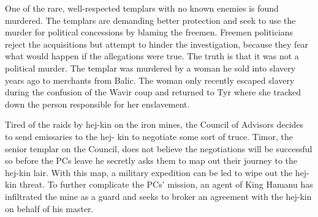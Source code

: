 {	\item One of the rare, well-respected templars with no known enemies is found murdered. The templars are demanding better protection and seek to use the murder for political concessions by blaming the freemen. Freemen politicians reject the acquisitions but attempt to hinder the investigation, because they fear what would happen if the allegations were true. The truth is that it was not a political murder. The templar was murdered by a woman he sold into slavery years ago to merchants from Balic. The woman only recently escaped slavery during the confusion of the Wavir coup and returned to Tyr where she tracked down the person responsible for her enslavement.
	\item Tired of the raids by hej-kin on the iron mines, the Council of Advisors decides to send emissaries to the hej- kin to negotiate some sort of truce. Timor, the senior templar on the Council, does not believe the negotiations will be successful so before the PCs leave he secretly asks them to map out their journey to the hej-kin lair. With this map, a military expedition can be led to wipe out the hej- kin threat. To further complicate the PCs' mission, an agent of King Hamanu has infiltrated the mine as a guard and seeks to broker an agreement with the hej-kin on behalf of his master.
}